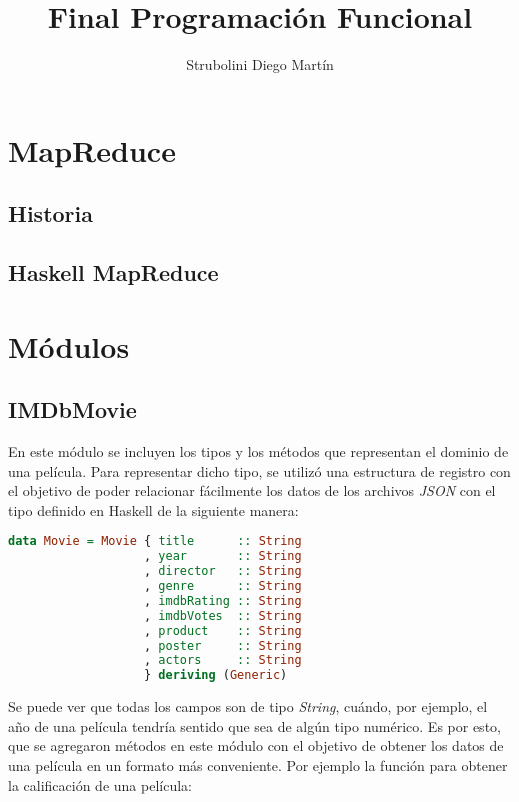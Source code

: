\documentclass[a4paper,11pt]{article}
\begin{document}
\title{Final Programación Funcional}
\author{Strubolini Diego Martín}

\maketitle

\section{MapReduce}

\subsection{Historia}

\subsection{Haskell MapReduce}

\section{Módulos}

\subsection{IMDbMovie}

En este módulo se incluyen los tipos y los métodos que representan el dominio de una película. Para representar dicho tipo, se utilizó una estructura de registro con el objetivo de poder relacionar fácilmente los datos de los archivos \textit{JSON} con el tipo definido en Haskell de la siguiente manera:

\begin{lstlisting}[language=Haskell,frame=single]
data Movie = Movie { title      :: String
                   , year       :: String
                   , director   :: String
                   , genre      :: String
                   , imdbRating :: String
                   , imdbVotes  :: String
                   , product    :: String
                   , poster     :: String
                   , actors     :: String 
                   } deriving (Generic)
\end{lstlisting}

Se puede ver que todas los campos son de tipo \textit{String}, cuándo, por ejemplo, el año de una película tendría sentido que sea de algún tipo numérico. Es por esto, que se agregaron métodos en este módulo con el objetivo de obtener los datos de una película en un formato más conveniente.
Por ejemplo la función para obtener la calificación de una película:
\end{document}
